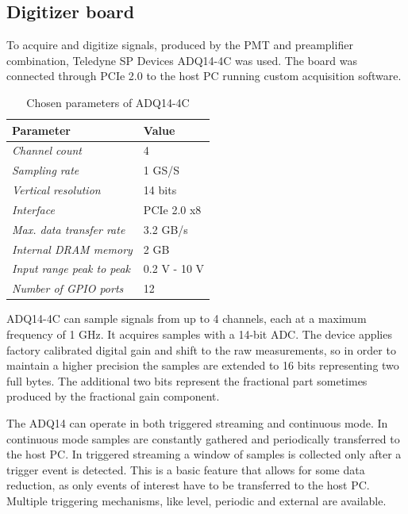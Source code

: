 \subsection{Digitizer board}

To acquire and digitize signals, produced by the PMT and preamplifier
combination, Teledyne SP Devices ADQ14-4C was used. The board was connected
through PCIe 2.0 to the host PC running custom acquisition software.
\begin{table}[H]
\caption{Chosen parameters of ADQ14-4C}
\centering
  \begin{tabular}{l | l}
  {\bfseries Parameter} & {\bfseries Value}\\
  \hline
  \textit {Channel count}             & 4 \\ \hline
  \textit {Sampling rate}  & 1 GS/S \\ \hline
  \textit {Vertical resolution}   & 14 bits\\ \hline
  \textit {Interface}         & PCIe 2.0 x8\\ \hline
  \textit {Max. data transfer rate}         & 3.2 GB/s\\ \hline
  \textit {Internal DRAM memory}      & 2 GB\\ \hline
  \textit {Input range peak to peak}   & 0.2 V - 10 V\\ \hline
  \textit {Number of GPIO ports}         & 12\\ 
  \end{tabular}
  \label{tab:adq14_datasheet}
\end{table}


ADQ14-4C can sample signals from up to 4 channels, each at a maximum
frequency of 1 GHz. It acquires samples with a 14-bit ADC.
The device applies factory calibrated digital gain and shift
to the raw measurements, 
so in order to maintain a higher precision the samples are 
extended to 16 bits representing two full bytes. 
The additional two bits represent the fractional part sometimes
produced by the fractional gain component.


The ADQ14 can operate in both triggered streaming and continuous mode.
In continuous mode samples are constantly gathered and periodically
transferred to the host PC. In triggered streaming a window of samples is 
collected only after a trigger event is detected. This is a basic feature
that allows for some data reduction, as only events of interest have to
be transferred to the host PC. Multiple triggering mechanisms, 
like level, periodic and external are available.


